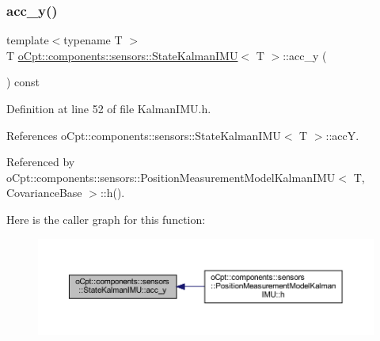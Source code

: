 \subsubsection{\texorpdfstring{acc\+\_\+y()}{acc\_y()}\hspace{0.1cm}{\footnotesize\ttfamily [1/2]}}
{\footnotesize\ttfamily template$<$typename T $>$ \\
T \hyperlink{classo_cpt_1_1components_1_1sensors_1_1_state_kalman_i_m_u}{o\+Cpt\+::components\+::sensors\+::\+State\+Kalman\+I\+MU}$<$ T $>$\+::acc\+\_\+y (\begin{DoxyParamCaption}{ }\end{DoxyParamCaption}) const\hspace{0.3cm}{\ttfamily [inline]}}



Definition at line 52 of file Kalman\+I\+M\+U.\+h.



References o\+Cpt\+::components\+::sensors\+::\+State\+Kalman\+I\+M\+U$<$ T $>$\+::accY.



Referenced by o\+Cpt\+::components\+::sensors\+::\+Position\+Measurement\+Model\+Kalman\+I\+M\+U$<$ T, Covariance\+Base $>$\+::h().

Here is the caller graph for this function\+:
\nopagebreak
\begin{figure}[H]
\begin{center}
\leavevmode
\includegraphics[width=350pt]{classo_cpt_1_1components_1_1sensors_1_1_state_kalman_i_m_u_abe4adf42c8c10cfd93c64732746de174_icgraph}
\end{center}
\end{figure}
\hypertarget{classo_cpt_1_1components_1_1sensors_1_1_state_kalman_i_m_u_aad935e3d6f0d674b9eec1e11b65678eb}{}\label{classo_cpt_1_1components_1_1sensors_1_1_state_kalman_i_m_u_aad935e3d6f0d674b9eec1e11b65678eb} 

